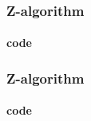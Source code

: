 \begin{frame}[fragile]
    \frametitle{Z-algorithm}
    \framesubtitle{code}

    
\end{frame}

\begin{frame}[fragile]
    \frametitle{Z-algorithm}
    \framesubtitle{code}

    
\end{frame}
